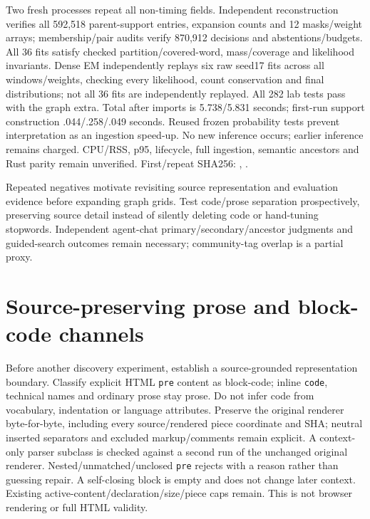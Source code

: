\documentclass[11pt]{article}
\begin{document}
Two fresh processes repeat all non-timing fields. Independent reconstruction
verifies all 592,518 parent-support entries, expansion counts and 12 masks/weight
arrays; membership/pair audits verify 870,912 decisions and abstentions/budgets.
All 36 fits satisfy checked partition/covered-word, mass/coverage and likelihood
invariants. Dense EM independently replays six raw seed17 fits across all
windows/weights, checking every likelihood, count conservation and final
distributions; not all 36 fits are independently replayed. All 282 lab tests
pass with the graph extra. Total after imports is 5.738/5.831 seconds;
first-run support construction .044/.258/.049 seconds. Reused frozen probability
tests prevent interpretation as an ingestion speed-up. No new inference occurs;
earlier inference remains charged. CPU/RSS, p95, lifecycle, full ingestion,
semantic ancestors and Rust parity remain unverified. First/repeat SHA256:
,
.

Repeated negatives motivate revisiting source representation and evaluation
evidence before expanding graph grids. Test code/prose separation prospectively,
preserving source detail instead of silently deleting code or hand-tuning
stopwords. Independent agent-chat primary/secondary/ancestor judgments and
guided-search outcomes remain necessary; community-tag overlap is a partial proxy.

\section{Source-preserving prose and block-code channels}
Before another discovery experiment, establish a source-grounded representation
boundary. Classify explicit HTML \texttt{pre} content as block-code; inline
\texttt{code}, technical names and ordinary prose stay prose. Do not infer code
from vocabulary, indentation or language attributes. Preserve the original
renderer byte-for-byte, including every source/rendered piece coordinate and
SHA; neutral inserted separators and excluded markup/comments remain explicit.
A context-only parser subclass is checked against a second run of the unchanged
original renderer. Nested/unmatched/unclosed \texttt{pre} rejects with a reason
rather than guessing repair. A self-closing block is empty and does not change
later context. Existing active-content/declaration/size/piece caps remain.
This is not browser rendering or full HTML validity.
\end{document}
